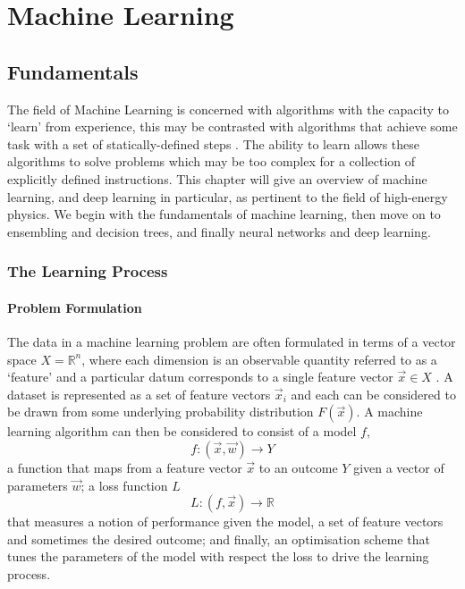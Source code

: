 \chapter{Machine Learning}
\label{chap:machine_learning}


\newpage

\section{Fundamentals}
The field of Machine Learning is concerned with algorithms with the capacity to `learn' from experience, this may be contrasted with algorithms that achieve some task with a set of statically-defined steps \cite{DeepLearningBook}. The ability to learn allows these algorithms to solve problems which may be too complex for a collection of explicitly defined instructions. 
This chapter will give an overview of machine learning, and deep learning in particular, as pertinent to the field of high-energy physics. We begin with the fundamentals of machine learning, then move on to ensembling and decision trees, and finally neural networks and deep learning.  


\subsection{The Learning Process}

\subsubsection{Problem Formulation}
The data in a machine learning problem are often formulated in terms of a vector space $X = \mathds{R}^{n}$, where each dimension is an observable quantity referred to as a `feature' and a particular datum corresponds to a single feature vector $\vec{x} \in X$ \cite{elementsOfStatsLearning}. A dataset is represented as a set of feature vectors $\vec{x}_{i}$ and each can be considered to be drawn from some underlying probability distribution $F(\vec{x})$.
A machine learning algorithm can then be considered \cite{elementsOfStatsLearning} to consist of a model $f$, 
\begin{equation}
    f:(\vec{x},\vec{w})\rightarrow{Y}
\end{equation}
a function that maps from a feature vector $\vec{x}$ to an outcome $Y$ given a vector of parameters $\vec{w}$; a loss function $L$
\begin{equation}
    L:(f,\vec{x})\rightarrow{\mathds{R}}
\end{equation}
that measures a notion of performance given the model, a set of feature vectors and sometimes the desired outcome; 
and finally, an optimisation scheme that tunes the parameters of the model with respect the loss to drive the learning process.


